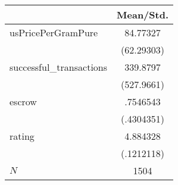{
\def\sym#1{\ifmmode^{#1}\else\(^{#1}\)\fi}
\begin{tabular}{l*{1}{c}}
\hline\hline
            &   Mean/Std.\\
\hline
usPricePerGramPure&    84.77327\\
            &  (62.29303)\\
successful\_transactions&    339.8797\\
            &  (527.9661)\\
escrow      &    .7546543\\
            &  (.4304351)\\
rating      &    4.884328\\
            &  (.1212118)\\
\hline
\(N\)       &        1504\\
\hline\hline
\end{tabular}
}
